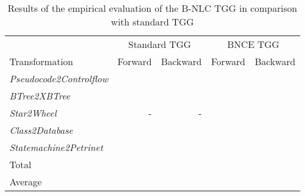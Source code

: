 
\begin{table}[h]
	\centering
	\begin{tabular}{l r r r r }
		\hline
			& \multicolumn{2}{c}{Standard TGG} & \multicolumn{2}{c}{BNCE TGG}\\
		Transformation 					& Forward & Backward & Forward & Backward \\
		\hline
		\emph{Pseudocode2Controlflow}	& 		& 		& 	 	&  \\
		\emph{BTree2XBTree}				&  		& 		& 		&  \\
		\emph{Star2Wheel}				& -		& -		& 	 	&  \\
		\emph{Class2Database}			& 		& 		&  		&   \\
		\emph{Statemachine2Petrinet}	& 		& 		& 		&  \\
		\hline
		Total					&  & 		&	& \\
		Average					&  & 		&	& \\
		\hline
	\end{tabular}
	\caption{Results of the empirical evaluation of the B-NLC TGG in comparison with standard TGG}
	\label{tab:evaluation}
\end{table}

